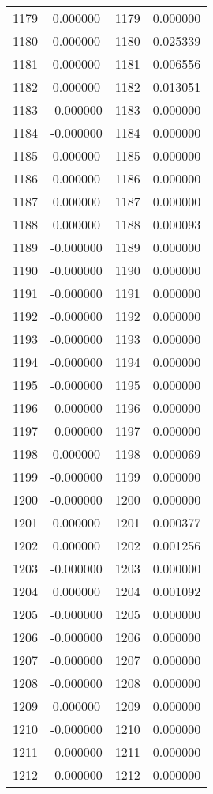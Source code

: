 \documentclass[12pt]{article}
\begin{document}
\begin{longtable}{@{}cccc@{}}
1179 & 0.000000 & 1179 & 0.000000 \\
1180 & 0.000000 & 1180 & 0.025339 \\
1181 & 0.000000 & 1181 & 0.006556 \\
1182 & 0.000000 & 1182 & 0.013051 \\
1183 & -0.000000 & 1183 & 0.000000 \\
1184 & -0.000000 & 1184 & 0.000000 \\
1185 & 0.000000 & 1185 & 0.000000 \\
1186 & 0.000000 & 1186 & 0.000000 \\
1187 & 0.000000 & 1187 & 0.000000 \\
1188 & 0.000000 & 1188 & 0.000093 \\
1189 & -0.000000 & 1189 & 0.000000 \\
1190 & -0.000000 & 1190 & 0.000000 \\
1191 & -0.000000 & 1191 & 0.000000 \\
1192 & -0.000000 & 1192 & 0.000000 \\
1193 & -0.000000 & 1193 & 0.000000 \\
1194 & -0.000000 & 1194 & 0.000000 \\
1195 & -0.000000 & 1195 & 0.000000 \\
1196 & -0.000000 & 1196 & 0.000000 \\
1197 & -0.000000 & 1197 & 0.000000 \\
1198 & 0.000000 & 1198 & 0.000069 \\
1199 & -0.000000 & 1199 & 0.000000 \\
1200 & -0.000000 & 1200 & 0.000000 \\
1201 & 0.000000 & 1201 & 0.000377 \\
1202 & 0.000000 & 1202 & 0.001256 \\
1203 & -0.000000 & 1203 & 0.000000 \\
1204 & 0.000000 & 1204 & 0.001092 \\
1205 & -0.000000 & 1205 & 0.000000 \\
1206 & -0.000000 & 1206 & 0.000000 \\
1207 & -0.000000 & 1207 & 0.000000 \\
1208 & -0.000000 & 1208 & 0.000000 \\
1209 & 0.000000 & 1209 & 0.000000 \\
1210 & -0.000000 & 1210 & 0.000000 \\
1211 & -0.000000 & 1211 & 0.000000 \\
1212 & -0.000000 & 1212 & 0.000000 \\

\end{longtable}
\end{document}
